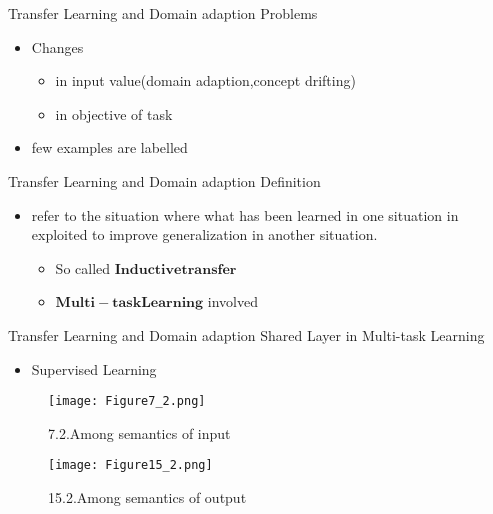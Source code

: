 
\begin{frame}{Transfer Learning and Domain adaption}
Problems
\begin{itemize}
  \item Changes
  \begin{itemize} %
    \item in input value(domain adaption,concept drifting)
    \item in objective of task
  \end{itemize}
  \item few examples are labelled
\end{itemize}
\end{frame}

\begin{frame}{Transfer Learning and Domain adaption}
Definition
\begin{itemize}
  \item refer to the situation where what has been learned in one situation in exploited to improve generalization in another situation.
    \begin{itemize} %
    \item So called $\bm{Inductive transfer}$
    \item $\bm{Multi-task Learning}$ involved
  \end{itemize}
 
\end{itemize}
\end{frame}

\begin{frame}{Transfer Learning and Domain adaption}
Shared Layer in Multi-task Learning
\begin{itemize}
\item Supervised Learning
\end{itemize}
\begin{figure}[htbp]
\centering
\begin{minipage}[t]{0.3\textwidth}
\centering
\texttt{[image: Figure7\_2.png]}
\caption{7.2.Among semantics of input}
\end{minipage}
\begin{minipage}[t]{0.3\textwidth}
\centering
\texttt{[image: Figure15\_2.png]}
\caption{15.2.Among semantics of output}
\end{minipage}
\end{figure}
\end{frame}

